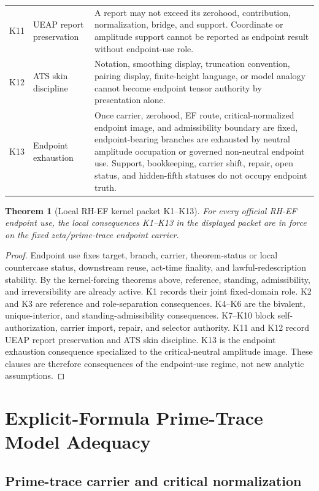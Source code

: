 \documentclass[11pt]{article}
\newtheorem{theorem}{Theorem}[section]
\begin{document}
\begin{longtable}{L{0.13\textwidth}L{0.25\textwidth}L{0.52\textwidth}}
K11 & UEAP report preservation & A report may not exceed its zerohood, contribution, normalization, bridge, and support.  Coordinate or amplitude support cannot be reported as endpoint result without endpoint-use role.\\
K12 & ATS skin discipline & Notation, smoothing display, truncation convention, pairing display, finite-height language, or model analogy cannot become endpoint tensor authority by presentation alone.\\
K13 & Endpoint exhaustion & Once carrier, zerohood, EF route, critical-normalized endpoint image, and admissibility boundary are fixed, endpoint-bearing branches are exhausted by neutral amplitude occupation or governed non-neutral endpoint use.  Support, bookkeeping, carrier shift, repair, open status, and hidden-fifth statuses do not occupy endpoint truth.\\
\bottomrule
\end{longtable}

\begin{theorem}[Local RH-EF kernel packet K1--K13]
For every official RH-EF endpoint use, the local consequences K1--K13 in the displayed packet are in force on the fixed zeta/prime-trace endpoint carrier.
\end{theorem}

\begin{proof}
Endpoint use fixes target, branch, carrier, theorem-status or local countercase status, downstream reuse, act-time finality, and lawful-redescription stability.  By the kernel-forcing theorems above, reference, standing, admissibility, and irreversibility are already active.  K1 records their joint fixed-domain role.  K2 and K3 are reference and role-separation consequences.  K4--K6 are the bivalent, unique-interior, and standing-admissibility consequences.  K7--K10 block self-authorization, carrier import, repair, and selector authority.  K11 and K12 record UEAP report preservation and ATS skin discipline.  K13 is the endpoint exhaustion consequence specialized to the critical-neutral amplitude image.  These clauses are therefore consequences of the endpoint-use regime, not new analytic assumptions.
\end{proof}

\section{Explicit-Formula Prime-Trace Model Adequacy}

\subsection{Prime-trace carrier and critical normalization}
\end{document}
